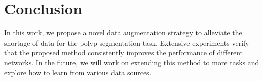\documentclass{article}
\begin{document}
\vspace{-0.3cm}

\section{Conclusion}
\vspace{-0.2cm}
In this work, we propose a novel data augmentation strategy to alleviate the shortage of data for the polyp segmentation task. Extensive experiments verify that the proposed method consistently improves the performance of different networks. In the future, we will work on extending this method to more tasks and explore how to learn from various data sources.




\end{document}

